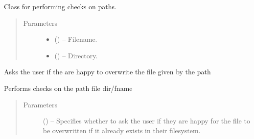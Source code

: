 \documentclass[letterpaper,10pt,english]{sphinxmanual}
\begin{document}
\begin{fulllineitems}
\label{\detokenize{references/misc:nmrespy._misc.PathManager}}
\sphinxAtStartPar
Class for performing checks on paths.
\begin{quote}\begin{description}
\item[{Parameters}] \leavevmode\begin{itemize}
\item {} 
\sphinxAtStartPar
{} () – Filename.

\item {} 
\sphinxAtStartPar
{} () – Directory.

\end{itemize}

\end{description}\end{quote}

\begin{fulllineitems}
\label{\detokenize{references/misc:nmrespy._misc.PathManager.ask_overwrite}}
\sphinxAtStartPar
Asks the user if the are happy to overwrite the file given
by the path 

\end{fulllineitems}


\begin{fulllineitems}
\label{\detokenize{references/misc:nmrespy._misc.PathManager.check_file}}
\sphinxAtStartPar
Performs checks on the path file dir/fname
\begin{quote}\begin{description}
\item[{Parameters}] \leavevmode
\sphinxAtStartPar
{} (\sphinxstyleliteralemphasis{\sphinxupquote{, }}) – Specifies whether to ask the user if they are happy for the file
 to be overwritten if it already exists in their
filesystem.


\end{description}
\end{quote}
\end{fulllineitems}
\end{fulllineitems}
\end{document}
